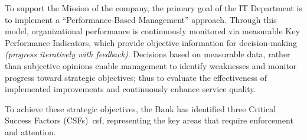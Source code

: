 To support the Mission of the company, the primary goal of the IT Department is to implement a ``Performance-Based Management'' approach. Through this model, organizational performance is continuously monitored via measurable Key Performance Indicators, which provide objective information for decision-making \textit{(progress iteratively with feedback)}. Decisions based on measurable data, rather than subjective opinions enable management to identify weaknesses and monitor progress toward strategic objectives; thus to evaluate the effectiveness of implemented improvements and continuously enhance service quality.

To achieve these strategic objectives, the Bank has identified three Critical Success Factors (CSFs)~\gls{csf}, representing the key areas that require enforcement and attention.

